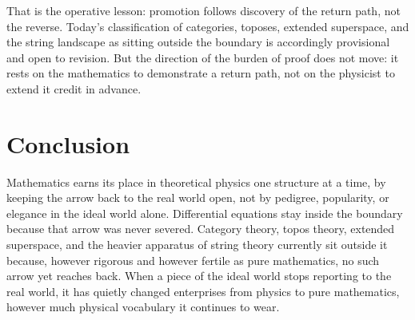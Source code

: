 \documentclass[11pt]{book}
\begin{document}
That is the operative lesson: promotion follows discovery of the return path, not the reverse. Today's classification of categories, toposes, extended superspace, and the string landscape as sitting outside the boundary is accordingly provisional and open to revision. But the direction of the burden of proof does not move: it rests on the mathematics to demonstrate a return path, not on the physicist to extend it credit in advance.

\section{Conclusion}

Mathematics earns its place in theoretical physics one structure at a time, by keeping the arrow back to the real world open, not by pedigree, popularity, or elegance in the ideal world alone. Differential equations stay inside the boundary because that arrow was never severed. Category theory, topos theory, extended superspace, and the heavier apparatus of string theory currently sit outside it because, however rigorous and however fertile as pure mathematics, no such arrow yet reaches back. When a piece of the ideal world stops reporting to the real world, it has quietly changed enterprises from physics to pure mathematics, however much physical vocabulary it continues to wear.
\end{document}
